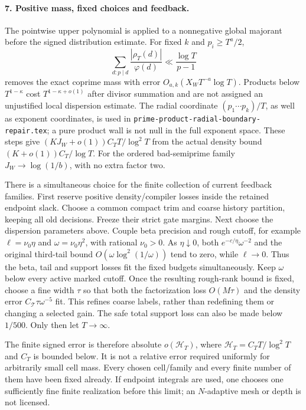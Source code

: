 \paragraph{7. Positive mass, fixed choices and feedback.}
The pointwise upper polynomial is applied to a nonnegative global
majorant before the signed distribution estimate. For fixed $k$
and $p_i\ge T^a/2$,
\[
 \sum_{d:p\mid d}\frac{|\rho_T(d)|}{\varphi(d)}
 \ll\frac{\log T}{p-1}
\]
removes the exact coprime mass with error
$O_{a,k}(X_WT^{-a}\log T)$. Products below $T^{1-\kappa}$
cost $T^{1-\kappa+o(1)}$ after divisor summation and are not
assigned an unjustified local dispersion estimate. The radial
coordinate $(p_1\cdots p_k)/T$, as well as exponent coordinates,
is used in \texttt{prime-product-radial-boundary-repair.tex}; a
pure product wall is not null in the full exponent space. These
steps give $(KJ_W+o(1))C_TT/\log^2T$ from the actual density
bound $(K+o(1))C_T/\log T$. For the ordered bad-semiprime
family $J_W\to\log(1/b)$, with no extra factor two.

There is a simultaneous choice for the finite collection of current
feedback families. First reserve positive density/compiler losses
inside the retained endpoint slack. Choose a common compact trim
and coarse history partition, keeping all old decisions. Freeze
their strict gate margins. Next choose the dispersion parameters
above. Couple beta precision and rough cutoff, for example
$\ell=\nu_0\eta$ and $\omega=\nu_0\eta^2$, with rational
$\nu_0>0$. As $\eta\downarrow0$, both
$e^{-c/\eta}\omega^{-2}$ and the original third-tail bound
$O(\omega\log^2(1/\omega))$ tend to zero, while $\ell\to0$.
Thus the beta, tail and support losses fit the fixed budgets
simultaneously. Keep $\omega$ below every active marked cutoff.
Once the resulting rough-rank bound is fixed, choose a fine width
$\tau$ so that both the factorization loss $O(M\tau)$ and the
density error $C_{\mathcal T}\tau\omega^{-5}$ fit. This refines
coarse labels, rather than redefining them or changing a selected
gain. The safe total support loss can also be made below $1/500$.
Only then let $T\to\infty$.

The finite signed error is therefore absolute $o(\mathcal H_T)$,
where $\mathcal H_T=C_TT/\log^2T$ and $C_T$ is bounded below.
It is not a relative error required uniformly for arbitrarily
small cell mass. Every chosen cell/family and every finite number
of them have been fixed already. If endpoint integrals are used,
one chooses one sufficiently fine finite realization before this
limit; an $N$-adaptive mesh or depth is not licensed.

